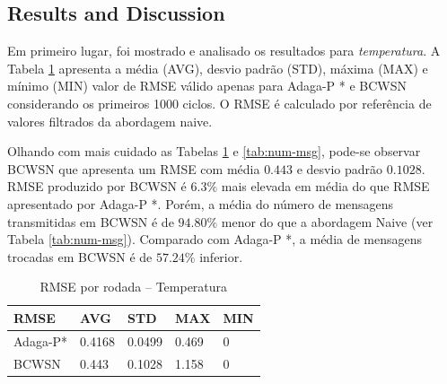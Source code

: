 \documentclass{acm_proc_article-sp}
\begin{document}
\subsection{Results and Discussion}
\label{results-and-discussion}

Em primeiro lugar, foi mostrado e analisado os resultados para
{\it temperatura}. A Tabela \ref{tab:rmse} apresenta a média (AVG), desvio
padrão (STD), máxima (MAX) e mínimo (MIN) valor de RMSE válido apenas para
Adaga-P * e BCWSN considerando os primeiros 1000 ciclos. O RMSE é calculado 
por referência de valores filtrados da abordagem naive.
\vspace*{-.3cm}

Olhando com mais cuidado as Tabelas \ref{tab:rmse} e \ref{tab:num-msg},
pode-se observar BCWSN que apresenta um RMSE com média $0.443$ e desvio padrão 
$0.1028$. RMSE produzido por BCWSN é $6.3\%$ mais elevada em média do 
que RMSE apresentado por Adaga-P *. Porém, a média do número de mensagens
transmitidas em BCWSN é de $94.80\%$ menor do que a abordagem Naive 
(ver Tabela  \ref{tab:num-msg}). Comparado com Adaga-P *, a média de mensagens
trocadas em BCWSN é de $57.24\%$ inferior.
\vspace*{-.3cm}

\begin{table}[h!]
\small
\caption{RMSE por rodada – Temperatura}
\label{tab:rmse}
\begin{center}
\begin{tabular}{|l||l|l|l|l|}
\hline
RMSE &AVG &STD &MAX &MIN \\
\hline\hline
Adaga-P* &0.4168 &0.0499 &0.469 &0 \\
\hline
BCWSN &0.443 &0.1028 &1.158 &0 \\
\hline
\end{tabular}
\end{center}
\end{table}
\vspace*{-.3cm}
\end{document}
